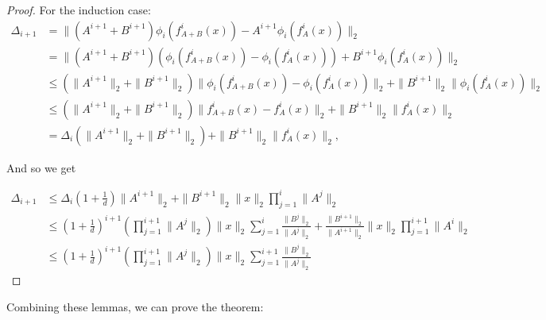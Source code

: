 \begin{proof}
For the induction case:
\begin{align*}
\Delta_{i+1} &= \|\left(A^{i+1}+B^{i+1}\right)\phi_i(f^i_{A+B}(x))- A^{i+1}\phi_i(f^i_{A}(x))\|_2 \\
&= \|\left(A^{i+1}+B^{i+1}\right)\left(\phi_i(f^i_{A+B}(x))- \phi_i(f^i_{A}(x))\right)+ B^{i+1}\phi_i( f^i_{A}(x))\|_2\\ 
&\leq \left(\|A^{i+1}\|_2+\|B^{i+1}\|_2\right)\|\phi_i(f^i_{A+B}(x))- \phi_i(f^i_{A}(x))\|_2+ \|B^{i+1}\|_2\|\phi_i(f^i_{A}(x))\|_2\\ 
&\leq \left(\|A^{i+1}\|_2+\|B^{i+1}\|_2\right)\|f^i_{A+B}(x)-f^i_{A}(x)\|_2+ \|B^{i+1}\|_2\|f^i_{A}(x)\|_2\\
&=\Delta_i\left(\|A^{i+1}\|_2+\|B^{i+1}\|_2\right)+ \|B^{i+1}\|_2\|f^i_{A}(x)\|_2,
\end{align*}


And so we get

\begin{align*}
\Delta_{i+1} &\leq \Delta_i\left(1+\frac{1}{d}\right)\|A^{i+1}\|_2+ \|B^{i+1}\|_2 \|x\|_2\prod_{j=1}^i \|A^j\|_2\\
&\leq \left(1+\frac{1}{d}\right)^{i+1} \left(\prod_{j=1}^{i+1}\|A^j\|_2\right)\|x\|_2\sum_{j=1}^i \frac{\|B^j\|_2}{\|A^j\|_2}+ \frac{\|B^{i+1}\|_2}{\|A^{i+1}\|_2}\|x\|_2\prod_{j=1}^{i+1}\|A^i\|_2\\
&\leq \left(1+\frac{1}{d}\right)^{i+1} \left(\prod_{j=1}^{i+1}\|A^j\|_2\right)\|x\|_2\sum_{j=1}^{i+1} \frac{\|B^j\|_2}{\|A^j\|_2}
\end{align*}
\end{proof}


Combining these lemmas, we can prove the theorem:

